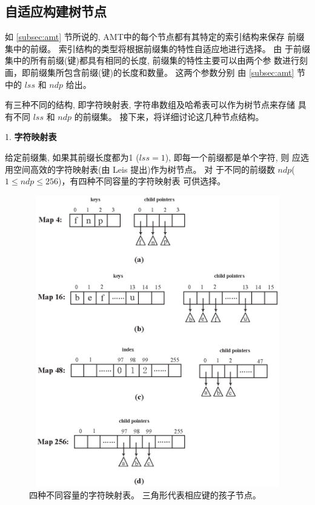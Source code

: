 \subsection{自适应构建树节点}
\label{subsec:nodes}

如 \ref{subsec:amt} 节所说的, AMT中的每个节点都有其特定的索引结构来保存
前缀集中的前缀。 索引结构的类型将根据前缀集的特性自适应地进行选择。 由
于前缀集中的所有前缀(键)都具有相同的长度, 前缀集的特性主要可以由两个参
数进行刻画，即前缀集所包含前缀(键)的长度和数量。 这两个参数分别
由 \ref{subsec:amt} 节中的 $lss$ 和 $ndp$ 给出。

有三种不同的结构, 即字符映射表, 字符串数组及哈希表可以作为树节点来存储
具有不同 $lss$ 和 $ndp$ 的前缀集。 接下来，将详细讨论这几种节点结构。

1. \textbf{字符映射表}

给定前缀集, 如果其前缀长度都为1 ($lss=1$), 即每一个前缀都是单个字符, 则
应选用空间高效的字符映射表(由 Leis \cite{Leis2013} 提出)作为树节点。 对
于不同的前缀数 $ndp$($1 \leq ndp \leq 256$)，有四种不同容量的字符映射表
可供选择。

\begin{figure}[H]
  \centering
  \includegraphics[height=5in, width=5in]{figures/2_MPM/character_map}
  \caption{四种不同容量的字符映射表。 三角形代表相应键的孩子节点。}
  \label{fig:character map}
\end{figure}

